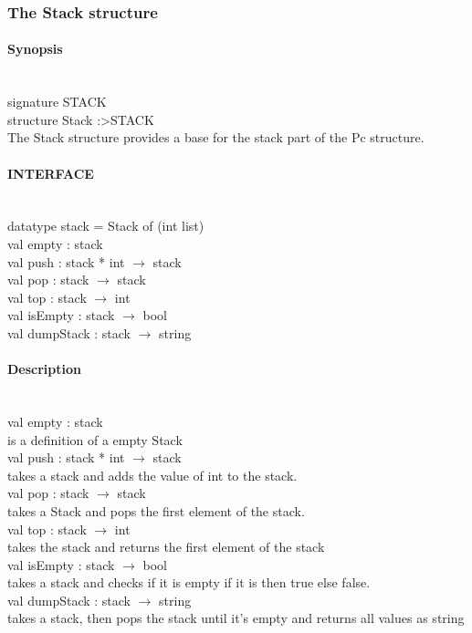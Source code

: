 \documentclass{article}
\begin{document}
\subsubsection{The Stack structure}
\paragraph{Synopsis}\
\\
signature STACK \\
structure Stack :\textgreater STACK
\\
The Stack structure provides a base for the stack part of the Pc structure.

\paragraph{INTERFACE}\
\\
	datatype stack = Stack of (int list)\\	
	val empty : stack \\
	val push : stack * int $\rightarrow$ stack\\					
	val pop : stack $\rightarrow$ stack\\						
	val top : stack $\rightarrow$ int\\						
	val isEmpty : stack $\rightarrow$ bool \\						
	val dumpStack : stack $\rightarrow$ string\\					 
	
\paragraph{Description}\
\\
	val empty : stack\\
		is a definition of a empty Stack
\\
	val push : stack * int $\rightarrow$ stack\\					
		takes a stack and adds the value of int to the stack.
\\
	val pop : stack $\rightarrow$ stack	\\					
		takes a Stack and pops the first element of the stack.
\\
	val top : stack $\rightarrow$ int\\							
		takes the stack and returns the first element of the stack
\\
	val isEmpty : stack $\rightarrow$ bool\\						
		takes a stack and checks if it is empty if it is then true else false.
\\
	val dumpStack : stack $\rightarrow$ string\\
		takes a stack, then pops the stack until it's empty and returns all values as string
\end{document}
